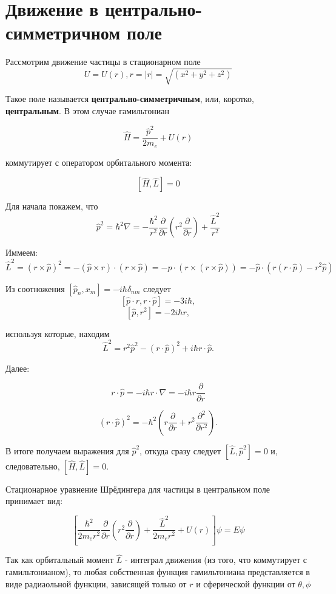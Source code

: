 \section {Движение в центрально-симметричном поле}
Рассмотрим движение частицы в стационарном поле 
$$U = U(r), r = |r| = \sqrt{(x^2 + y^2 + z^2)}$$

Такое поле называется {\bf центрально-симметричным}, или, коротко,
{\bf центральным}. В этом случае гамильтониан

$$\hat H = \frac{\hat p^2}{2m_e} + U(r)$$

коммутирует с оператором орбитального момента:

$$[\hat H, \hat L] = 0$$

Для начала покажем, что 
$$\hat p^2 = \hbar^2 \nabla = - \frac{\hbar ^2}{r^2} \frac{\partial}{\partial r} \left( r^2 \frac{\partial}{\partial r} \right) + \frac{\hat L^2}{r^2}$$

Иммеем:
$$\hat L^2 = (r \times \hat p)^2 = - (\hat p \times r) \cdot (r \times \hat p) = - \hat p \cdot (r \times (r \times \hat p)) = - \hat p \cdot (r (r \cdot \hat p) - r^2 \hat p)$$

Из соотножения $[\hat p_n, x_m] = - i \hbar \delta_{nm}$ следует
$$[\hat p \cdot r, r \cdot \hat p] = - 3 i \hbar,$$
$$[\hat p, r^2] = - 2 i \hbar r,$$

используя которые, находим
$$\hat L^2 = r^2 \hat p^2 - (r \cdot \hat p)^2 + i \hbar r \cdot \hat p.$$

Далее:

$$r \cdot \hat p = -i \hbar r \cdot \nabla = -i \hbar r \frac{\partial}{\partial r}$$

$$(r \cdot \hat p)^2 = - \hbar^2 \left( r \frac{\partial}{\partial r} + r^2\frac{\partial^2}{\partial r^2} \right).$$

В итоге получаем выражения для $\hat p^2$, откуда сразу следует $[\hat L, \hat p^2] = 0$ и, следовательно, $[\hat H, \hat L] = 0$.

Стационарное уравнение Шрёдингера для частицы в центральном поле принимает вид:

$$ \left[ \frac{\hbar ^ 2}{2 m_e r^2} \frac{\partial}{\partial r} \left (r^2 \frac{\partial}{\partial r}
\right) + \frac{\hat L^2}{2 m_e r^2} + U(r) \right] \psi = E \psi$$

Так как орбитальный момент $\hat L$ - интеграл движения (из того, что коммутирует с гамильтонианом), то любая собственная функция гамильтониана представляется в виде радиаольной функции, зависящей только от $r$ и сферической функции от $\theta, \phi$

